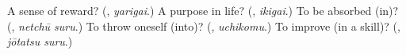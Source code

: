 \begin{tcolorbox}[breakable,colback=teal!4,colframe=teal!35!black,title={Before you move on}]
A sense of reward? (\textbf{}, \emph{yarigai}.) A purpose in life? (\textbf{}, \emph{ikigai}.) To be absorbed (in)? (\textbf{}, \emph{netchū suru}.) To throw oneself (into)? (\textbf{}, \emph{uchikomu}.) To improve (in a skill)? (\textbf{}, \emph{jōtatsu suru}.)
\end{tcolorbox}
